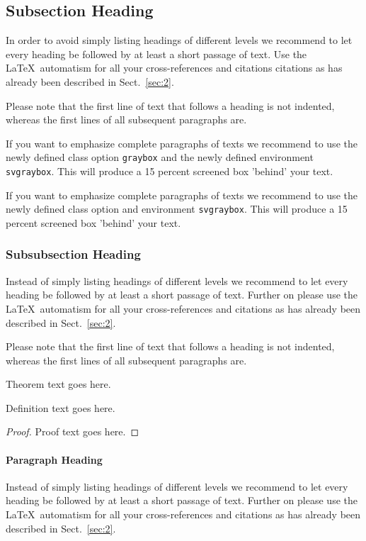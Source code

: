 \documentclass[graybox]{svmult}
\begin{document}
{\subsection{Subsection Heading} %
In order to avoid simply listing headings of different levels we recommend to let every heading be followed by at least a short passage of text. Use the \LaTeX\ automatism for all your cross-references and citations citations as has already been described in Sect.~\ref{sec:2}.

Please note that the first line of text that follows a heading is not indented, whereas the first lines of all subsequent paragraphs are.

\begin{svgraybox}
If you want to emphasize complete paragraphs of texts we recommend to use the newly defined class option \verb|graybox| and the newly defined environment \verb|svgraybox|. This will produce a 15 percent screened box 'behind' your text.

If you want to emphasize complete paragraphs of texts we recommend to use the newly defined class option and environment \verb|svgraybox|. This will produce a 15 percent screened box 'behind' your text.
\end{svgraybox}


\subsubsection{Subsubsection Heading}
Instead of simply listing headings of different levels we recommend to let every heading be followed by at least a short passage of text.  Further on please use the \LaTeX\ automatism for all your cross-references and citations as has already been described in Sect.~\ref{sec:2}.

Please note that the first line of text that follows a heading is not indented, whereas the first lines of all subsequent paragraphs are.

\begin{theorem}
Theorem text goes here.
\end{theorem}
%
%
\begin{definition}
Definition text goes here.
\end{definition}

\begin{proof}
Proof text goes here.
\end{proof}

\paragraph{Paragraph Heading} %
Instead of simply listing headings of different levels we recommend to let every heading be followed by at least a short passage of text.  Further on please use the \LaTeX\ automatism for all your cross-references and citations as has already been described in Sect.~\ref{sec:2}.

}
\end{document}

